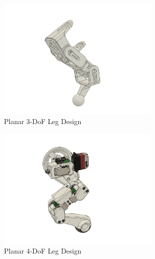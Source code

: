                 \begin{figure}[H]
                    \centering
                    \includegraphics[width=0.7\textwidth]{figures/3dof.png}
                    \caption{Planar 3-DoF Leg Design}
                    \label{fig:3DoFDesign}
                \end{figure}
                
                \begin{figure}[H]
                    \centering
                    \includegraphics[width=0.7\textwidth]{figures/4dof.png}
                    \caption{Planar 4-DoF Leg Design}
                    \label{fig:4DoFDesign}
                \end{figure}


